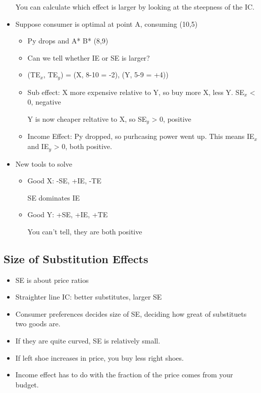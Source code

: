 \documentclass{article}
\begin{document}
\begin{itemize}
    You can calculate which effect is larger by looking at the steepness of the IC.
  \item Suppose consumer is optimal at point A, consuming (10,5)
    \begin{itemize}
      \item Py drops and A* \Rightarrow{} B* (8,9)
      \item Can we tell whether IE or SE is larger?
      \item (TE$_x$, TE$_y$) = (X, 8-10 = -2), (Y, 5-9 = +4))
      \item Sub effect: X more expensive relative to Y, so buy more X, less Y. SE$_x$ < 0, negative

       Y is now cheaper reltative to X, so SE$_y$ > 0, positive
      \item Income Effect: Py dropped, so purhcasing power went up. This means
        IE$_x$ and IE$_y$ > 0, both positive.
    \end{itemize}
  \item New tools to solve
    \begin{itemize}
      \item Good X: -SE, +IE, -TE

        SE dominates IE
      \item Good Y: +SE, +IE, +TE

        You can't tell, they are both positive
    \end{itemize}

\end{itemize}

\subsection{Size of Substitution Effects}
\begin{itemize}
  \item SE is about price ratios
  \item Straighter line IC: better substitutes, larger SE
  \item Consumer preferences decides size of SE, deciding how great
    of substituets two goods are.
  \item If they are quite curved, SE is relatively small.
  \item If left shoe increases in price, you buy less right shoes.
  \item Income effect has to do with the fraction of the price comes
    from your budget.
\end{itemize}
\end{document}
